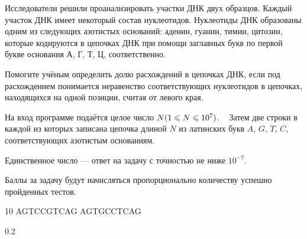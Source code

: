 
Исследователи решили проанализировать участки ДНК двух образцов. 
Каждый участок ДНК имеет некоторый состав нуклеотидов. Нуклеотиды ДНК образованы одним из следующих азотистых 
оснований: аденин, гуанин, тимин, цитозин, которые кодируются в цепочках ДНК при помощи заглавных 
букв по первой букве основания А, Г, Т, Ц, соответственно.

Помогите учёным определить долю расхождений в цепочках ДНК, если под расхождением понимается неравенство 
соответствующих нуклеотидов в цепочках, находящихся на одной позиции, считая от левого края.


На вход программе подаётся целое число $N\space(1\leq N \leq 10^7)$.  
Затем две строки в каждой из которых записана цепочка длиной $N$ из латинских букв $A$, $G$, $T$, $C$, 
соответствующих азотистым основаниям.

\outputfmtSection

Единственное число — ответ на задачу с точностью не ниже $10^{-7}$.

\markSection

Баллы за задачу будут начисляться пропорционально количеству успешно пройденных тестов.


\begin{myverbbox}[\small]{\vinput}
10
AGTCCGTCAG
AGTGCCTCAG
\end{myverbbox}
\begin{myverbbox}[\small]{\voutput}
0.2
\end{myverbbox}

